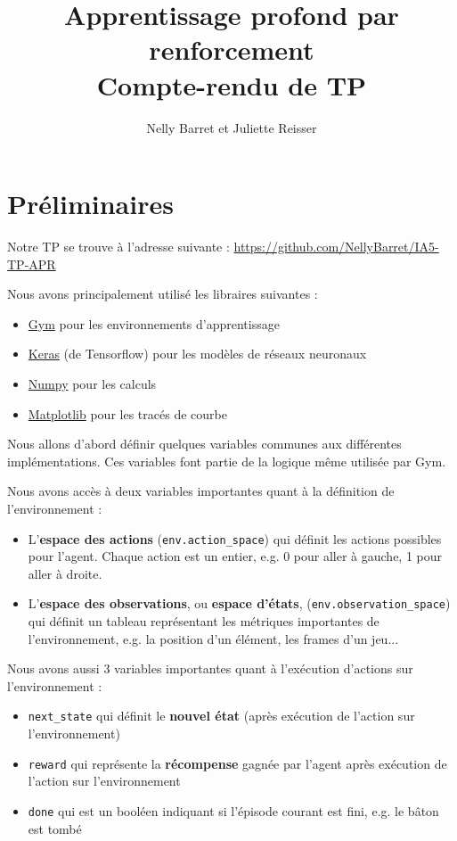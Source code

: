\documentclass[10pt,a4paper]{article}
\title{Apprentissage profond par renforcement \\ Compte-rendu de TP}
\author{Nelly Barret et Juliette Reisser}
\begin{document}
\maketitle

\section{Préliminaires} \label{prelim}
Notre TP se trouve à l'adresse suivante : \href{https://github.com/NellyBarret/IA5-TP-APR}{https://github.com/NellyBarret/IA5-TP-APR}

Nous avons principalement utilisé les libraires suivantes :
\begin{itemize}
	\item \href{https://gym.openai.com/}{Gym} pour les environnements d'apprentissage
	\item \href{https://keras.io/}{Keras} (de Tensorflow) pour les modèles de réseaux neuronaux
	\item \href{https://numpy.org/}{Numpy} pour les calculs
	\item \href{https://matplotlib.org/index.html}{Matplotlib} pour les tracés de courbe
\end{itemize}

Nous allons d'abord définir quelques variables communes aux différentes implémentations. Ces variables font partie de la logique même utilisée par Gym.

Nous avons accès à deux variables importantes quant à la définition de l'environnement :
\begin{itemize}
	\item L'\textbf{espace des actions} (\lstinline{env.action_space}) qui définit les actions possibles pour l'agent. Chaque action est un entier, e.g. 0 pour aller à gauche, 1 pour aller à droite.
	\item L'\textbf{espace des observations}, ou \textbf{espace d'états}, (\lstinline{env.observation_space}) qui définit un tableau représentant les métriques importantes de l'environnement, e.g. la position d'un élément, les frames d'un jeu...
\end{itemize}

Nous avons aussi 3 variables importantes quant à l'exécution d'actions sur l'environnement :
\begin{itemize}
	\item \lstinline{next_state} qui définit le \textbf{nouvel état} (après exécution de l'action sur l'environnement)
	\item \lstinline{reward} qui représente la \textbf{récompense} gagnée par l'agent après exécution de l'action sur l'environnement
	\item \lstinline{done} qui est un booléen indiquant si l'épisode courant est fini, e.g. le bâton est tombé
\end{itemize}
\end{document}
